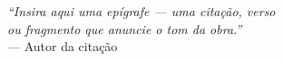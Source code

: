 \thispagestyle{empty}
\vspace*{6cm}
\begin{flushright}
\textit{``Insira aqui uma epígrafe --- uma citação, verso\\
ou fragmento que anuncie o tom da obra.''}\\[4pt]
--- Autor da citação
\end{flushright}
\clearpage
